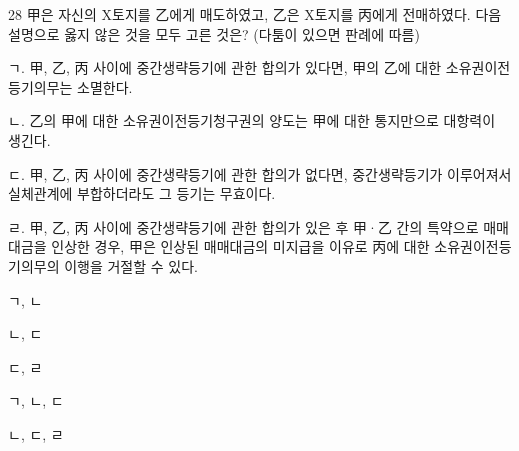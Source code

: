 \begin{question}{28}
甲은 자신의 X토지를 乙에게 매도하였고, 乙은 X토지를 丙에게 전매하였다. 다음 설명으로 옳지 않은 것을 모두 고른 것은? (다툼이 있으면 판례에 따름)
\begin{framedtext}
ㄱ. 甲, 乙, 丙 사이에 중간생략등기에 관한 합의가 있다면, 甲의 乙에 대한 소유권이전등기의무는 소멸한다. \par
ㄴ. 乙의 甲에 대한 소유권이전등기청구권의 양도는 甲에 대한 통지만으로 대항력이 생긴다. \par
ㄷ. 甲, 乙, 丙 사이에 중간생략등기에 관한 합의가 없다면, 중간생략등기가 이루어져서 실체관계에 부합하더라도 그 등기는 무효이다. \par
ㄹ. 甲, 乙, 丙 사이에 중간생략등기에 관한 합의가 있은 후 甲·乙 간의 특약으로 매매대금을 인상한 경우, 甲은 인상된 매매대금의 미지급을 이유로 丙에 대한 소유권이전등기의무의 이행을 거절할 수 있다. \par
\end{framedtext}
\begin{choices}
  \item ㄱ, ㄴ
  \item ㄴ, ㄷ
  \item ㄷ, ㄹ
  \item ㄱ, ㄴ, ㄷ
  \item ㄴ, ㄷ, ㄹ
\end{choices}
\end{question}
